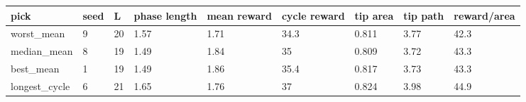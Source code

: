 \begin{tabular}{lllllllll}
\toprule
pick & seed & L & phase length & mean reward & cycle reward & tip area & tip path & reward/area \\
\midrule
worst\_mean & 9 & 20 & 1.57 & 1.71 & 34.3 & 0.811 & 3.77 & 42.3 \\
median\_mean & 8 & 19 & 1.49 & 1.84 & 35 & 0.809 & 3.72 & 43.3 \\
best\_mean & 1 & 19 & 1.49 & 1.86 & 35.4 & 0.817 & 3.73 & 43.3 \\
longest\_cycle & 6 & 21 & 1.65 & 1.76 & 37 & 0.824 & 3.98 & 44.9 \\
\bottomrule
\end{tabular}
